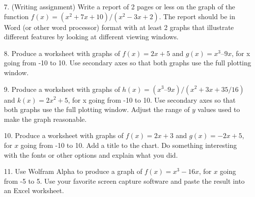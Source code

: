 \documentclass[10pt,]{book}
\theoremstyle{plain}
\theoremstyle{definition}
\theoremstyle{definition}
\begin{document}
\begin{exerciselist}
\item[7.]\hypertarget{exercise-59}{} (Writing assignment) Write a report of 2 pages or less on the graph of the function
\(f(x) = (x^2 + 7 x + 10)/(x^2 - 3 x +2)\).  The report should be in Word (or other word processor) format with at least 2 graphs that illustrate different features by looking at different viewing windows.
%
\par\smallskip
\item[8.]\hypertarget{exercise-60}{} Produce a worksheet with graphs of \(f(x) = 2 x + 5\) and \(g(x) = x^3 – 9 x\), for x going from -10 to 10.  Use secondary axes so that both graphs use the full plotting window.
%
\par\smallskip
\item[9.]\hypertarget{exercise-61}{} Produce a worksheet with graphs of \(h(x) = (x^3 – 9 x)/(x^2 + 3 x + 35/16)\) and \(k(x) = 2 x^2 + 5\), for x going from -10 to 10.  Use secondary axes so that both graphs use the full plotting window.  Adjust the range of \(y\) values used to make the graph reasonable.
%
\par\smallskip
\item[10.]\hypertarget{exercise-62}{} Produce a worksheet with graphs of \(f(x) = 2 x + 3\) and \(g(x) = -2 x +5\), for \(x\) going from -10 to 10.  Add a title to the chart.  Do something interesting with the fonts or other options and explain what you did.
%
\par\smallskip
\item[11.]\hypertarget{exercise-63}{} Use Wolfram Alpha to produce a graph of \(f(x) = x^3 - 16 x\), for \(x\) going from -5 to 5.  Use your favorite screen capture software and paste the result into an Excel worksheet.
%
\par\smallskip
\end{exerciselist}
\typeout{************************************************}
\typeout{************************************************}
\end{document}
